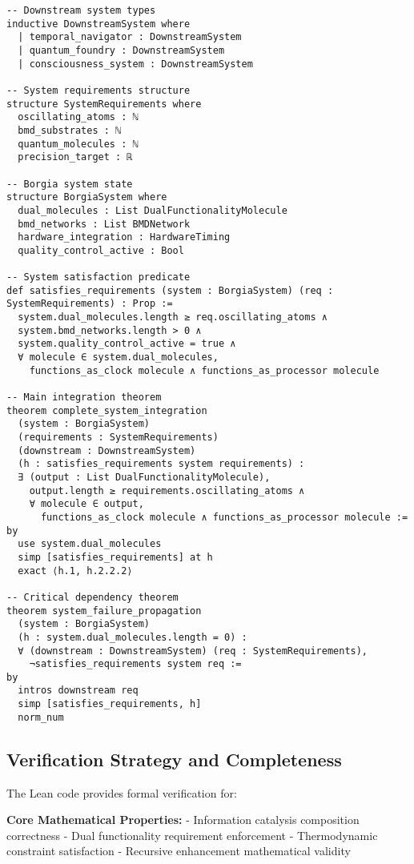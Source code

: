 \begin{lstlisting}[language=lean, caption=Complete System Integration Verification]
-- Downstream system types
inductive DownstreamSystem where
  | temporal_navigator : DownstreamSystem
  | quantum_foundry : DownstreamSystem  
  | consciousness_system : DownstreamSystem

-- System requirements structure
structure SystemRequirements where
  oscillating_atoms : ℕ
  bmd_substrates : ℕ
  quantum_molecules : ℕ
  precision_target : ℝ

-- Borgia system state
structure BorgiaSystem where
  dual_molecules : List DualFunctionalityMolecule
  bmd_networks : List BMDNetwork
  hardware_integration : HardwareTiming
  quality_control_active : Bool

-- System satisfaction predicate
def satisfies_requirements (system : BorgiaSystem) (req : SystemRequirements) : Prop :=
  system.dual_molecules.length ≥ req.oscillating_atoms ∧
  system.bmd_networks.length > 0 ∧
  system.quality_control_active = true ∧
  ∀ molecule ∈ system.dual_molecules, 
    functions_as_clock molecule ∧ functions_as_processor molecule

-- Main integration theorem
theorem complete_system_integration
  (system : BorgiaSystem)
  (requirements : SystemRequirements)
  (downstream : DownstreamSystem)
  (h : satisfies_requirements system requirements) :
  ∃ (output : List DualFunctionalityMolecule),
    output.length ≥ requirements.oscillating_atoms ∧
    ∀ molecule ∈ output, 
      functions_as_clock molecule ∧ functions_as_processor molecule :=
by
  use system.dual_molecules
  simp [satisfies_requirements] at h
  exact ⟨h.1, h.2.2.2⟩

-- Critical dependency theorem  
theorem system_failure_propagation
  (system : BorgiaSystem)
  (h : system.dual_molecules.length = 0) :
  ∀ (downstream : DownstreamSystem) (req : SystemRequirements),
    ¬satisfies_requirements system req :=
by
  intros downstream req
  simp [satisfies_requirements, h]
  norm_num
\end{lstlisting}

\subsection{Verification Strategy and Completeness}

The Lean code provides formal verification for:

\textbf{Core Mathematical Properties:}
- Information catalysis composition correctness
- Dual functionality requirement enforcement
- Thermodynamic constraint satisfaction
- Recursive enhancement mathematical validity

